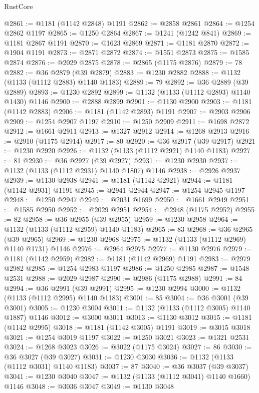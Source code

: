 \begin{lexlean}{RustCore}
\begin{coremodule}
@2861 := @1181 (@1142 @2848) @1191
@2862 := @2858 @2861
@2864 := @1254 @2862 @1197
@2865 := @1250 @2864
@2867 := @1241 (@1242 @841)
@2869 := @1181 @2867 @1191
@2870 := @1623 @2869
@2871 := @1181 @2870
@2872 := @1904 @1191
@2873 := @2871 @2872
@2874 := @1551 @2873
@2875 := @1585 @2874
@2876 := @2029 @2875
@2878 := @2865 (@1175 @2876)
@2879 := 78
@2882 := @36 @2879 (@39 @2879)
@2883 := @1230 @2882
@2888 := @1132 (@1133 (@1112 @2883) @1140 @1183)
@2889 := 79
@2892 := @36 @2889 (@39 @2889)
@2893 := @1230 @2892
@2899 := @1132 (@1133 (@1112 @2893) @1140 @1430) @1146
@2900 := @2888 @2899
@2901 := @1130 @2900
@2903 := @1181 (@1142 @2883)
@2906 := @1181 (@1142 @2893) @1191
@2907 := @2903 @2906
@2909 := @1254 @2907 @1197
@2910 := @1250 @2909
@2911 := @1698 @2872
@2912 := @1661 @2911
@2913 := @1327 @2912
@2914 := @1268 @2913
@2916 := @2910 (@1175 @2914)
@2917 := 80
@2920 := @36 @2917 (@39 @2917)
@2921 := @1230 @2920
@2926 := @1132 (@1133 (@1112 @2921) @1140 @1183)
@2927 := 81
@2930 := @36 @2927 (@39 @2927)
@2931 := @1230 @2930
@2937 := @1132 (@1133 (@1112 @2931) @1140 @1807) @1146
@2938 := @2926 @2937
@2939 := @1130 @2938
@2941 := @1181 (@1142 @2921)
@2944 := @1181 (@1142 @2931) @1191
@2945 := @2941 @2944
@2947 := @1254 @2945 @1197
@2948 := @1250 @2947
@2949 := @2031 @1699
@2950 := @1661 @2949
@2951 := @1585 @2950
@2952 := @2029 @2951
@2954 := @2948 (@1175 @2952)
@2955 := 82
@2958 := @36 @2955 (@39 @2955)
@2959 := @1230 @2958
@2964 := @1132 (@1133 (@1112 @2959) @1140 @1183)
@2965 := 83
@2968 := @36 @2965 (@39 @2965)
@2969 := @1230 @2968
@2975 := @1132 (@1133 (@1112 @2969) @1140 @1731) @1146
@2976 := @2964 @2975
@2977 := @1130 @2976
@2979 := @1181 (@1142 @2959)
@2982 := @1181 (@1142 @2969) @1191
@2983 := @2979 @2982
@2985 := @1254 @2983 @1197
@2986 := @1250 @2985
@2987 := @1548 @2531
@2988 := @2029 @2987
@2990 := @2986 (@1175 @2988)
@2991 := 84
@2994 := @36 @2991 (@39 @2991)
@2995 := @1230 @2994
@3000 := @1132 (@1133 (@1112 @2995) @1140 @1183)
@3001 := 85
@3004 := @36 @3001 (@39 @3001)
@3005 := @1230 @3004
@3011 := @1132 (@1133 (@1112 @3005) @1140 @1887) @1146
@3012 := @3000 @3011
@3013 := @1130 @3012
@3015 := @1181 (@1142 @2995)
@3018 := @1181 (@1142 @3005) @1191
@3019 := @3015 @3018
@3021 := @1254 @3019 @1197
@3022 := @1250 @3021
@3023 := @1321 @2531
@3024 := @1268 @3023
@3026 := @3022 (@1175 @3024)
@3027 := 86
@3030 := @36 @3027 (@39 @3027)
@3031 := @1230 @3030
@3036 := @1132 (@1133 (@1112 @3031) @1140 @1183)
@3037 := 87
@3040 := @36 @3037 (@39 @3037)
@3041 := @1230 @3040
@3047 := @1132 (@1133 (@1112 @3041) @1140 @1660) @1146
@3048 := @3036 @3047
@3049 := @1130 @3048

\end{coremodule}
\end{lexlean}
